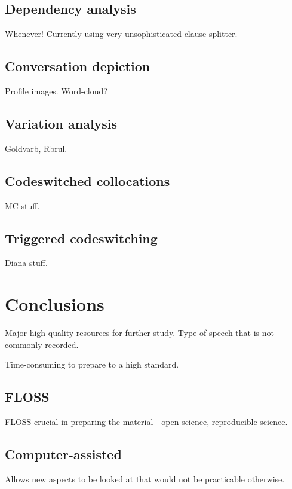 \documentclass[a4paper, twocolumn, 11pt, twoside]{article}
\begin{document}
\subsection{Dependency analysis}

Whenever!  Currently using very unsophisticated clause-splitter.

\subsection{Conversation depiction}

Profile images.  Word-cloud?

\subsection{Variation analysis}

Goldvarb, Rbrul.

\subsection{Codeswitched collocations}

MC stuff.

\subsection{Triggered codeswitching}

Diana stuff.


\section{Conclusions}

Major high-quality resources for further study.  Type of speech that is not commonly recorded.

Time-consuming to prepare to a high standard.

\subsection{FLOSS}

FLOSS crucial in preparing the material - open science, reproducible science.

\subsection{Computer-assisted}

Allows new aspects to be looked at that would not be practicable otherwise.
\end{document}

